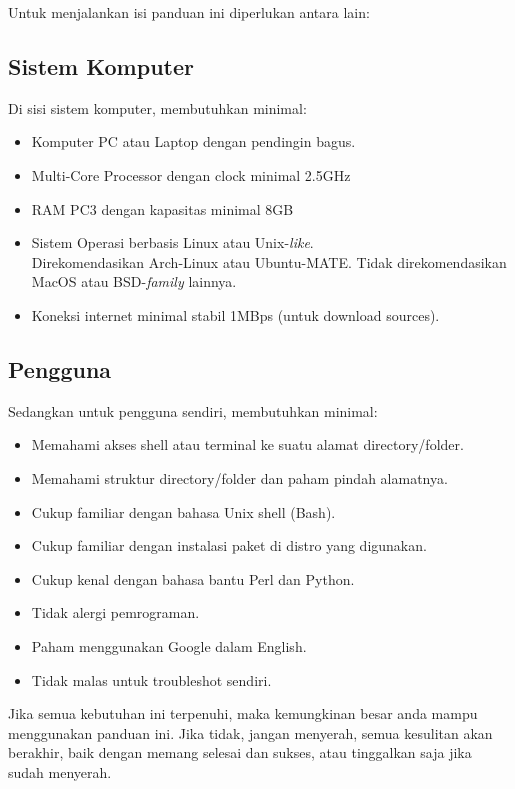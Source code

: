 \documentclass[12pt,]{article}
\begin{document}
	Untuk menjalankan isi panduan ini diperlukan antara lain:

	\subsection{Sistem Komputer}
	Di sisi sistem komputer, membutuhkan minimal:

	\begin{itemize}
		\item Komputer PC atau Laptop dengan pendingin bagus.
		\item Multi-Core Processor dengan clock minimal 2.5GHz
		\item RAM PC3 dengan kapasitas minimal 8GB
		\item Sistem Operasi berbasis Linux atau Unix-\textit{like}.\\
		Direkomendasikan Arch-Linux atau Ubuntu-MATE.
		Tidak direkomendasikan MacOS atau BSD-\textit{family} lainnya.
		\item Koneksi internet minimal stabil 1MBps (untuk download sources).
	\end{itemize}

	\subsection{Pengguna}
	Sedangkan untuk pengguna sendiri, membutuhkan minimal:

	\begin{itemize}
		\item Memahami akses shell atau terminal ke suatu alamat directory/folder.
		\item Memahami struktur directory/folder dan paham pindah alamatnya.
		\item Cukup familiar dengan bahasa Unix shell (Bash).
		\item Cukup familiar dengan instalasi paket di distro yang digunakan.
		\item Cukup kenal dengan bahasa bantu Perl dan Python.
		\item Tidak alergi pemrograman.
		\item Paham menggunakan Google dalam English.
		\item Tidak malas untuk troubleshot sendiri.
	\end{itemize}

	Jika semua kebutuhan ini terpenuhi, maka kemungkinan besar anda mampu menggunakan panduan ini.
	Jika tidak, jangan menyerah, semua kesulitan akan berakhir, baik dengan memang selesai dan sukses, atau tinggalkan saja jika sudah menyerah.
\end{document}
